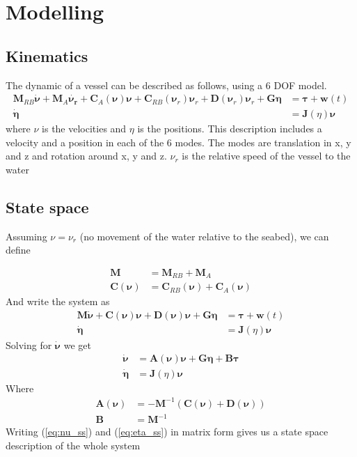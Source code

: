 \documentclass[12pt,a4]{article}
\begin{document}
\section{Modelling}


\subsection{Kinematics}
The dynamic of a vessel can be described as follows, using a 6 DOF model.
\begin{align}
	\bm{M}_{RB}\bm{\dot{\nu}} + \bm{M}_{A}\bm{\dot{\nu_r}} + \bm{C}_{A}(\bm{\nu})\bm{\nu} + \bm{C}_{RB}(\bm{\nu}_r)\bm{\nu}_r
	+ \bm{D}(\bm{\nu}_r)\bm{\nu}_r +\bm{G}\bm{\eta} & = \bm{\tau} + \bm{w}(t) \\
	\bm{\dot{\eta}}                                 & = \bm{J}(\eta)\bm{\nu}
\end{align}
where $\nu$ is the velocities and $\eta$ is the positions. This description includes a velocity and a position in each of the 6 modes.
The modes are translation in x, y and z and rotation around x, y and z. $\nu_r$ is the relative speed of the vessel to the water

\subsection{State space}
Assuming $\nu = \nu_r$ (no movement of the water relative to the seabed), we can define

\begin{align}
	\bm{M}           & = \bm{M}_{RB} + \bm{M}_{A}                     \\
	\bm{C}(\bm{\nu}) & = \bm{C}_{RB}(\bm{\nu}) + \bm{C}_{A}(\bm{\nu})
\end{align}
And write the system as
\begin{align}
	\bm{M}\bm{\dot{\nu}} + \bm{C}(\bm{\nu})\bm{\nu} + \bm{D}(\bm{\nu})\bm{\nu} +\bm{G}\bm{\eta} & = \bm{\tau} + \bm{w}(t) \\
	\bm{\dot{\eta}}                                                                             & = \bm{J}(\eta)\bm{\nu}
\end{align}
Solving for $\bm{\dot{\nu}}$ we get
\begin{align}
	\bm{\dot{\nu}}  & =	\bm{A}(\bm{\nu})\bm{\nu}+\bm{G}\bm{\eta}+\bm{B}\bm{\tau} 		\label{eq:nu_ss} \\
	\bm{\dot{\eta}} & =	\bm{J}(\eta)\bm{\nu}								\label{eq:eta_ss}
\end{align}
Where
\begin{align}
	\bm{A}(\bm{\nu}) & = -\bm{M}^{-1}(\bm{C}(\bm{\nu})+\bm{D}(\bm{\nu})) \\
	\bm{B}           & = \bm{M}^{-1}
\end{align}
Writing (\ref{eq:nu_ss}) and (\ref{eq:eta_ss}) in matrix form gives us a state space description of the whole system
\end{document}

